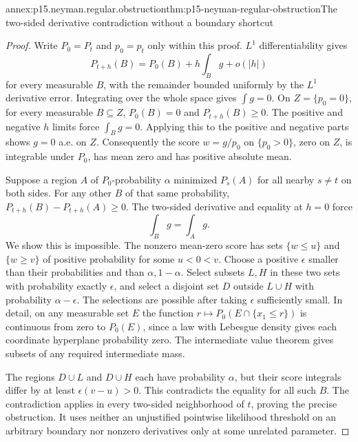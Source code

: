 \begin{annexitem}{annex:p15.neyman.regular.obstruction}{thm:p15-neyman-regular-obstruction}{The two-sided derivative contradiction without a boundary shortcut}
\begin{proof}
Write \(P_0=P_t\) and \(p_0=p_t\)
only within this proof.
\(L^1\) differentiability gives
\[
                  P_{t+h}(B)=P_0(B)+h\int_Bg+o(|h|)
\]
for every measurable \(B\), with
the remainder bounded uniformly
by the \(L^1\) derivative error.
Integrating over the whole space
gives \(\int g=0\).
On \(Z=\{p_0=0\}\), for every
measurable \(B\subseteq Z\),
\(P_0(B)=0\) and
\(P_{t+h}(B)\geq0\).
The positive and negative \(h\)
limits force \(\int_Bg=0\).
Applying this to the positive
and negative parts shows
\(g=0\) a.e. on \(Z\).
Consequently the score
\(w=g/p_0\) on \(\{p_0>0\}\),
zero on \(Z\), is integrable
under \(P_0\), has mean zero
and has positive absolute mean.

Suppose a region \(A\) of
\(P_0\)-probability \(\alpha\)
minimized \(P_s(A)\) for all
nearby \(s\ne t\) on both sides.
For any other \(B\) of that
same probability,
\(P_{t+h}(B)-P_{t+h}(A)\geq0\).
The two-sided derivative and
equality at \(h=0\) force
\[
                              \int_Bg=\int_Ag.
\]
We show this is impossible.
The nonzero mean-zero score
has sets \(\{w\leq u\}\)
and \(\{w\geq v\}\) of
positive probability for some
\(u<0<v\).
Choose a positive \(\epsilon\)
smaller than their probabilities
and than \(\alpha,1-\alpha\).
Select subsets \(L,H\) in
these two sets with probability
exactly \(\epsilon\), and
select a disjoint set \(D\)
outside \(L\cup H\) with
probability \(\alpha-\epsilon\).
The selections are possible
after taking \(\epsilon\)
sufficiently small. In detail,
on any measurable set \(E\)
the function
\(r\mapsto P_0(E\cap\{x_1\leq r\})\)
is continuous from zero to
\(P_0(E)\), since a law with
Lebesgue density gives each
coordinate hyperplane probability
zero. The intermediate value
theorem gives subsets of
any required intermediate mass.

The regions \(D\cup L\)
and \(D\cup H\) each
have probability \(\alpha\),
but their score integrals
differ by at least
\(\epsilon(v-u)>0\).
This contradicts the equality
for all such \(B\).
The contradiction applies in
every two-sided neighborhood
of \(t\), proving the
precise obstruction. It uses
neither an unjustified
pointwise likelihood threshold
on an arbitrary boundary nor
nonzero derivatives only at
some unrelated parameter.
\end{proof}
\end{annexitem}

